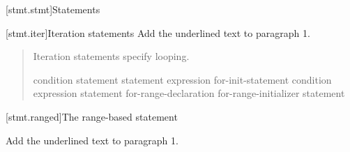 \begingroup
\renewcommand{\cleardoublepage}{}
\renewcommand{\clearpage}{}
[stmt.stmt]{Statements}%
\endgroup

\setcounter{section}{4}
[stmt.iter]{Iteration statements}%
Add the underlined text to paragraph 1.

\begin{quote}
\pnum
Iteration statements specify looping.

%
%
%
%
\begin{bnf}
	\br
	 condition \terminal{)} statement\br
	 statement  expression \terminal{) ;}\br
	 for-init-statement condition\opt \terminal{;} expression\opt \terminal{)} statement\br
	  
    \terminal{(} for-range-declaration \terminal{:} for-range-initializer \terminal{)} statement\br
\end{bnf}
\end{quote}


\setcounter{subsection}{3}
[stmt.ranged]{The range-based  statement}%

Add the underlined text to paragraph 1.

